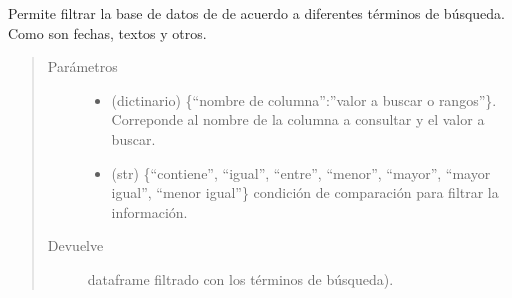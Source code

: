 \documentclass[letterpaper,10pt,openany,spanish]{sphinxmanual}
\begin{document}
\begin{fulllineitems}
\label{\detokenize{metadatos:metadatos.table_search}}
Permite filtrar la base de datos de  de acuerdo a diferentes términos de búsqueda. Como son fechas, textos y otros.
\begin{quote}\begin{description}
\item[{Parámetros}] \leavevmode\begin{itemize}
\item {} 
 \textendash{} (dictinario) \{“nombre de columna”:”valor a buscar o rangos”\}. Correponde al nombre de la columna a consultar y el valor a buscar.

\item {} 
 \textendash{} (str) \{“contiene”, “igual”, “entre”, “menor”, “mayor”, “mayor igual”, “menor igual”\} condición de comparación para filtrar la información.

\end{itemize}

\item[{Devuelve}] \leavevmode
dataframe  filtrado con los términos de búsqueda).

\end{description}\end{quote}

\end{fulllineitems}

\end{document}
